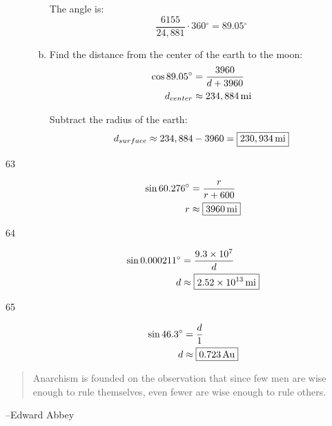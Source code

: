 \documentclass{exam}
\newcommand{\dg}{\ensuremath{^\circ}}
\begin{document}
\begin{description}
\begin{enumerate}[(a)]
            The angle is:
            \[
              \frac{6155}{24,881} \cdot 360 \dg = \boxed{ 89.05 \dg }
            \]

          \item Find the distance from the center of the earth to the moon:
            \begin{align*}
              \cos 89.05 \dg & = \frac{3960}{d + 3960} \\
              d_{center}     & \approx \unit[ 234,884 ]{mi} \\
            \end{align*}

            Subtract the radius of the earth:
            \[
              d_{surface} \approx 234,884 - 3960 = \boxed{ \unit[230,934]{mi} } 
            \]

        \end{enumerate}

        \item[63]
          \begin{align*}
            \sin 60.276 \dg & = \frac{r}{r + 600} \\
            r               & \approx \boxed{ \unit[3960]{mi} } \\
          \end{align*}

        \item[64]
          \begin{align*}
            \sin 0.000211 \dg & = \frac{9.3 \times 10^7}{d} \\
            d               & \approx \boxed{ \unit[2.52 \times 10^{13}]{mi} } \\
          \end{align*}

        \item[65]
          \begin{align*}
            \sin 46.3 \dg & = \frac{d}{1} \\
            d             & \approx \boxed{ \unit[0.723]{Au} } \\
          \end{align*}

    \end{description}

  \else
    \vspace{7 cm}
    \begin{quote}
      \begin{em}
        Anarchism is founded on the observation that since few men are wise enough to rule themselves, even fewer are
        wise enough to rule others.  
      \end{em}
    \end{quote}
    \hspace{1 cm} --Edward Abbey
  \fi
\end{document}
